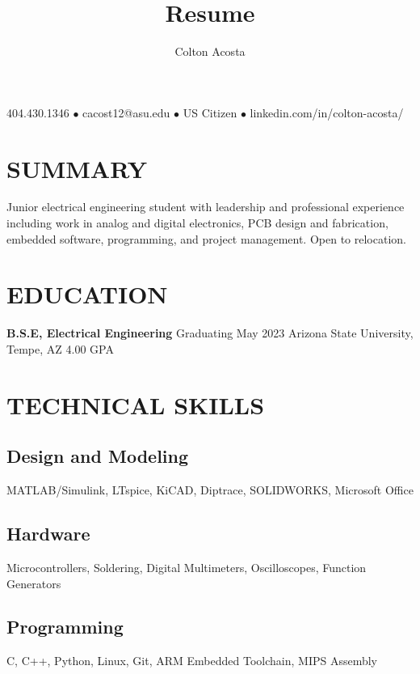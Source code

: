 \documentclass{article}
\makeatletter
\renewcommand{\maketitle}{
	\begin{center}
		{\huge\bfseries
			\theauthor}
			
		404.430.1346 $\bullet$ cacost12@asu.edu $\bullet$ US Citizen $\bullet$ linkedin.com/in/colton-acosta/
	\end{center}
}
\makeatother
\begin{document}
\title{Resume}
\author{Colton Acosta}
\maketitle
\section{SUMMARY}
Junior electrical engineering student with leadership and professional experience including work in analog and digital electronics, PCB design and fabrication, embedded software, programming, and project management. Open to relocation.

\section{EDUCATION}
\textbf{B.S.E, Electrical Engineering}
\hfill 
Graduating May 2023
\linebreak
Arizona State University, Tempe, AZ 
\hfill
4.00 GPA

\section{TECHNICAL SKILLS}
\subsection{Design and Modeling}
MATLAB/Simulink, LTspice, KiCAD, Diptrace, SOLIDWORKS, Microsoft Office
\subsection{Hardware}
Microcontrollers, Soldering, Digital Multimeters, Oscilloscopes, Function Generators
\subsection{Programming} 
C, C++, Python, Linux, Git, ARM Embedded Toolchain, MIPS Assembly
\end{document}
